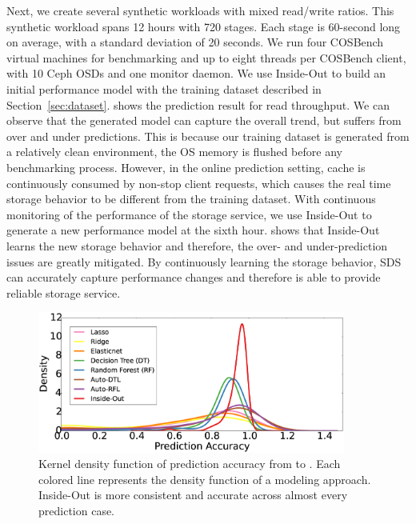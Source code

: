 Next, we create several synthetic workloads with mixed read/write ratios.
This synthetic workload spans 12 hours with 720 stages.
Each stage is 60-second long on average, with a standard deviation of 20 seconds.
We run four COSBench virtual machines for benchmarking and up to eight threads per COSBench client, with 10 Ceph OSDs and one monitor daemon.
We use Inside-Out to build an initial performance model with the training dataset described in Section~\ref{sec:dataset}.
\myfigure{\ref{fig:real_workload}} shows the prediction result for read throughput.
We can observe that the generated model can capture the overall trend, but suffers from over and under predictions.
This is because our training dataset is generated from a relatively clean environment, \ie the OS memory is flushed before any benchmarking process.
However, in the online prediction setting, cache is continuously consumed by non-stop client requests, which 
causes the real time storage behavior to be different from the training dataset.
With continuous monitoring of the performance of the storage service, 
we use Inside-Out to generate a new performance model at the sixth hour.
\myfigure{\ref{fig:real_workload}} shows that Inside-Out learns the new storage behavior and therefore, 
the over- and under-prediction issues are greatly mitigated.
By continuously learning the storage behavior, SDS can accurately capture performance changes and therefore is able to provide reliable storage service.



\begin{figure}
\centering
\includegraphics[width=0.9\textwidth, keepaspectratio]{Chapter-InsideOut/figures/aggregate_median.eps}
\caption{Kernel density function of prediction accuracy from \myfigure{\ref{fig:changing_workload}} to \myfigure{\ref{fig:multi_tenancy}}.  Each colored line represents the density function of a modeling approach.  Inside-Out is more consistent and accurate across almost every prediction case.}
\label{fig:aggregate}
\end{figure}


